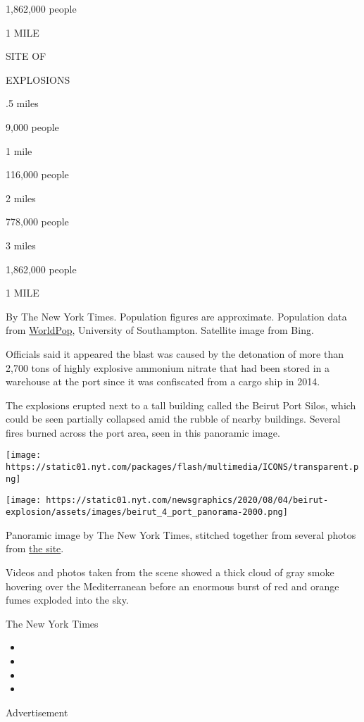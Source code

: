 1,862,000 people

1 MILE

SITE OF

EXPLOSIONS

.5 miles

9,000 people

1 mile

116,000 people

2 miles

778,000 people

3 miles

1,862,000 people

1 MILE

By The New York Times. Population figures are approximate. Population
data from \href{https://www.worldpop.org/}{WorldPop}, University of
Southampton. Satellite image from Bing.

Officials said it appeared the blast was caused by the detonation of
more than 2,700 tons of highly explosive ammonium nitrate that had been
stored in a warehouse at the port since it was confiscated from a cargo
ship in 2014.

The explosions erupted next to a tall building called the Beirut Port
Silos, which could be seen partially collapsed amid the rubble of nearby
buildings. Several fires burned across the port area, seen in this
panoramic image.

\texttt{[image: https://static01.nyt.com/packages/flash/multimedia/ICONS/transparent.png]}

\texttt{[image: https://static01.nyt.com/newsgraphics/2020/08/04/beirut-explosion/assets/images/beirut\_4\_port\_panorama-2000.png]}

Panoramic image by The New York Times, stitched together from several
photos from
\href{https://twitter.com/PsychologyDoc/status/1290705761467801601}{the
site}.

Videos and photos taken from the scene showed a thick cloud of gray
smoke hovering over the Mediterranean before an enormous burst of red
and orange fumes exploded into the sky.

The New York Times

\begin{itemize}
\item
\item
\item
\item
\end{itemize}

Advertisement

